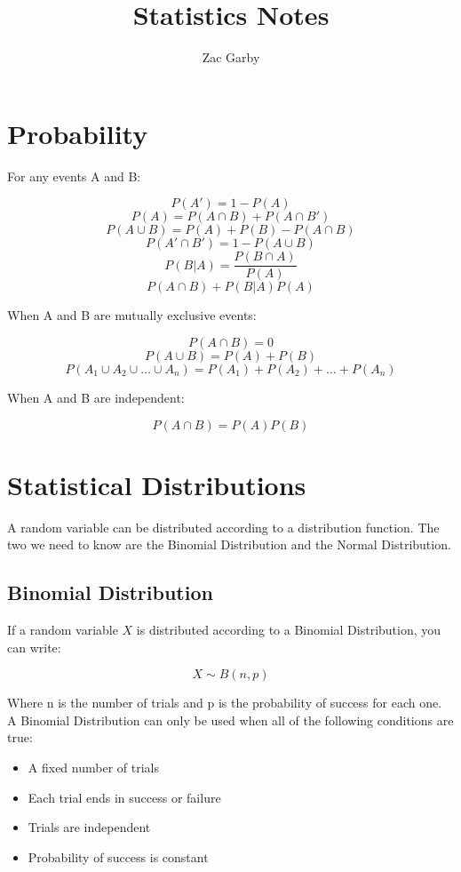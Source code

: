 \documentclass{article}
\title{Statistics Notes}
\author{Zac Garby}
\begin{document}
\maketitle
\tableofcontents

\section{Probability}

For any events A and B:

$$ P(A') = 1 - P(A) $$
$$ P(A) = P(A \cap B) + P(A \cap B') $$
$$ P(A \cup B) = P(A) + P(B) - P(A \cap B) $$
$$ P(A' \cap B') = 1 - P(A \cup B) $$
$$ P(B|A) = \frac {P(B \cap A)} {P(A)} $$
$$ P(A \cap B) + P(B|A) P(A) $$

When A and B are mutually exclusive events:

$$ P(A \cap B) = 0 $$
$$ P(A \cup B) = P(A) + P(B) $$
$$ P(A_1 \cup A_2 \cup \dots \cup A_n) = P(A_1) + P(A_2) + \dots + P(A_n) $$

When A and B are independent:

$$ P(A \cap B) = P(A) P(B) $$

\break

\section{Statistical Distributions}

A random variable can be distributed according to a distribution function. The two
we need to know are the Binomial Distribution and the Normal Distribution.

\subsection{Binomial Distribution}

If a random variable $X$ is distributed according to a Binomial Distribution, you can
write:

$$ X \sim B(n, p) $$

Where n is the number of trials and p is the probability of success for each one.
A Binomial Distribution can only be used when all of the following conditions are true:

\begin{itemize}
	\item A fixed number of trials
	\item Each trial ends in success or failure
	\item Trials are independent
	\item Probability of success is constant
\end{itemize}
\end{document}
